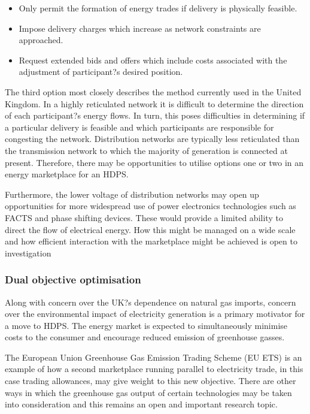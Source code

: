 \begin{itemize}
  \item Only permit the formation of energy trades if delivery is physically
  feasible.
  \item Impose delivery charges which increase as network constraints are
   approached.
  \item Request extended bids and offers which include costs associated with
  the adjustment of participant?s desired position.
\end{itemize}

The third option most closely describes the method currently used in the United
Kingdom.  In a highly reticulated network it is difficult to determine the
direction of each participant?s energy flows.  In turn, this poses
difficulties in determining if a particular delivery is feasible and which
participants are responsible for congesting the network.  Distribution
networks are typically less reticulated than the transmission network to which
the majority of generation is connected at present.  Therefore, there may be
opportunities to utilise options one or two in an energy marketplace for an
HDPS.

Furthermore, the lower voltage of distribution networks may open up
opportunities for more widespread use of power electronics technologies such
as FACTS and phase shifting devices.  These would provide a limited ability to
direct the flow of electrical energy.  How this might be managed on a wide
scale and how efficient interaction with the marketplace might be achieved is
open to investigation

\subsubsection{Dual objective optimisation}
Along with concern over the UK?s dependence on natural gas imports, concern
over the environmental impact of electricity generation is a primary motivator
for a move to HDPS.  The energy market is expected to simultaneously minimise
costs to the consumer and encourage reduced emission of greenhouse gasses.

The European Union Greenhouse Gas Emission Trading Scheme (EU ETS) is an
example of how a second marketplace running parallel to electricity trade, in
this case trading allowances, may give weight to this new objective.  There
are other ways in which the greenhouse gas output of certain technologies may
be taken into consideration and this remains an open and important research
topic.

